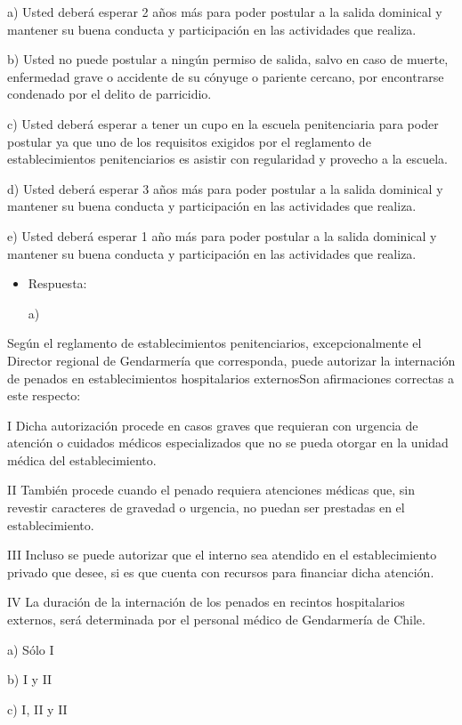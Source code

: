 \documentclass[letterpaper, 11pt]{article}
\begin{document}
a) Usted deberá esperar 2 años más para poder postular a la salida
dominical y mantener su buena conducta y participación en las
actividades que realiza.

b) Usted no puede postular a ningún permiso de salida, salvo en caso
de muerte, enfermedad grave o accidente de su cónyuge o pariente
cercano, por encontrarse condenado por el delito de parricidio.

c) Usted deberá esperar a tener un cupo en la escuela penitenciaria
para poder postular ya que uno de los requisitos exigidos por el
reglamento de establecimientos penitenciarios es asistir con
regularidad y provecho a la escuela.

d) Usted deberá esperar 3 años más para poder postular a la salida
dominical y mantener su buena conducta y participación en las
actividades que realiza.

e) Usted deberá esperar 1 año más para poder postular a la salida
dominical y mantener su buena conducta y participación en las
actividades que realiza.

\begin{itemize}
\item Respuesta:

a)
\end{itemize}


Según el reglamento de establecimientos penitenciarios,
excepcionalmente el Director regional de Gendarmería que corresponda,
puede autorizar la internación de penados en establecimientos
hospitalarios externosSon afirmaciones correctas a este respecto:

I Dicha autorización procede en casos graves que requieran con
urgencia de atención o cuidados médicos especializados que no se pueda
otorgar en la unidad médica del establecimiento.

II También procede cuando el penado requiera atenciones médicas que,
sin revestir caracteres de gravedad o urgencia, no puedan ser
prestadas en el establecimiento.

III Incluso se puede autorizar que el interno sea atendido en el
establecimiento privado que desee, si es que cuenta con recursos para
financiar dicha atención.

IV La duración de la internación de los penados en recintos
hospitalarios externos, será determinada por el personal médico de
Gendarmería de Chile.


a) Sólo I

b) I y II

c) I, II y II
\end{document}
